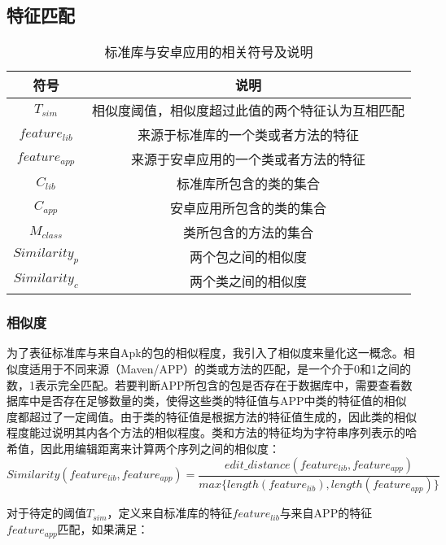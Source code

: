 \subsection{特征匹配}


\begin{table}[!hpt]
  \caption{标准库与安卓应用的相关符号及说明}
  \label{tab:symbol}
  \centering
  \begin{tabular}{cc} \toprule
    符号 &  说明 \\ \midrule
    $T_{sim}$ & 相似度阈值，相似度超过此值的两个特征认为互相匹配 \\
	$feature_{lib}$ & 来源于标准库的一个类或者方法的特征 \\ 
	$feature_{app}$ & 来源于安卓应用的一个类或者方法的特征 \\
	$C_{lib}$ & 标准库所包含的类的集合 \\
	$C_{app}$ & 安卓应用所包含的类的集合 \\
	$M_{class}$ & 类所包含的方法的集合\\
	$Similarity_p$ & 两个包之间的相似度\\
	$Similarity_c$ & 两个类之间的相似度\\
	 \bottomrule

  \end{tabular}
\end{table}


\subsubsection{相似度}

为了表征标准库与来自Apk的包的相似程度，我引入了相似度来量化这一概念。相似度适用于不同来源（Maven/APP）的类或方法的匹配，是一个介于0和1之间的数，1表示完全匹配。若要判断APP所包含的包是否存在于数据库中，需要查看数据库中是否存在足够数量的类，使得这些类的特征值与APP中类的特征值的相似度都超过了一定阈值。由于类的特征值是根据方法的特征值生成的，因此类的相似程度能过说明其内各个方法的相似程度。类和方法的特征均为字符串序列表示的哈希值，因此用编辑距离来计算两个序列之间的相似度：
\begin{equation}
Similarity(feature_{lib},feature_{app})=\frac{edit\_distance(feature_{lib},feature_{app})}{max\{length(feature_{lib}),length(feature_{app})\}}
\end{equation}

对于待定的阈值$T_{sim}$，定义来自标准库的特征$feature_{lib}$与来自APP的特征$feature_{app}$匹配，如果满足：

